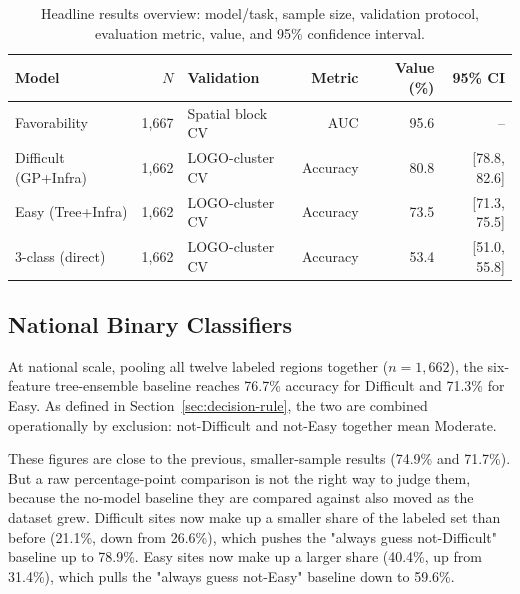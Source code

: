 \documentclass[11pt,a4paper]{article}
\renewcommand{\arraystretch}{1.15}
\begin{document}
\begin{table}[H]
\centering\small
\caption{Headline results overview: model/task, sample size, validation protocol, evaluation metric, value, and 95\% confidence interval.}
\label{tab:headline}
\renewcommand{\arraystretch}{1.3}
\begin{tabular}{@{}lrlrrr@{}}
\toprule
Model & $N$ & Validation & Metric & Value (\%) & 95\% CI \\
\midrule
Favorability & 1{,}667 & Spatial block CV & AUC & 95.6 & -- \\
Difficult (GP+Infra) & 1{,}662 & LOGO-cluster CV & Accuracy & 80.8 & [78.8, 82.6] \\
Easy (Tree+Infra) & 1{,}662 & LOGO-cluster CV & Accuracy & 73.5 & [71.3, 75.5] \\
3-class (direct) & 1{,}662 & LOGO-cluster CV & Accuracy & 53.4 & [51.0, 55.8] \\
\bottomrule
\end{tabular}

\vspace{2pt}
\end{table}

\subsection{National Binary Classifiers}
\label{sec:national}
At national scale, pooling all twelve labeled regions together ($n=1{,}662$), the six-feature tree-ensemble baseline reaches 76.7\% accuracy for Difficult and 71.3\% for Easy. As defined in Section~\ref{sec:decision-rule}, the two are combined operationally by exclusion: not-Difficult and not-Easy together mean Moderate.

These figures are close to the previous, smaller-sample results (74.9\% and 71.7\%). But a raw percentage-point comparison is not the right way to judge them, because the no-model baseline they are compared against also moved as the dataset grew. Difficult sites now make up a smaller share of the labeled set than before (21.1\%, down from 26.6\%), which pushes the "always guess not-Difficult" baseline up to 78.9\%. Easy sites now make up a larger share (40.4\%, up from 31.4\%), which pulls the "always guess not-Easy" baseline down to 59.6\%.
\end{document}
